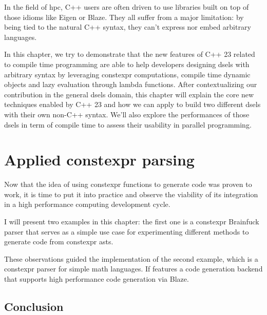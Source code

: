 \documentclass[english,12pt,a4paper]{book}
\providecommand{\cpp}{\textsc{C++}\xspace}
\begin{document}
In the field of \acrlong{hpc}, \cpp users are often driven to use
libraries built on top of those idioms like Eigen\cite{eigen} or
Blaze\cite{blazelib,iglberger2012_2}. They all suffer from a major limitation:
by being tied to the natural \cpp syntax, they can't express nor embed arbitrary
languages.

In this chapter, we try to demonstrate that the new features of \cpp23 related
to compile time programming are able to help developers designing \glspl{dsel}
with arbitrary syntax by leveraging \gls{constexpr} computations, compile time
dynamic objects and lazy evaluation through lambda functions.
After contextualizing our contribution in the general \glspl{dsel} domain,
this chapter will explain the core new techniques enabled by \cpp23
and how we can apply to build two different \glspl{dsel} with their own
non-\cpp syntax. We'll also explore the performances of those \glspl{dsel}
in term of compile time to assess their usability in parallel programming.




\chapter{
  Applied constexpr parsing
}

Now that the idea of using \gls{constexpr} functions to generate code
was proven to work, it is time to put it into practice and observe
the viability of its integration in a high performance computing
development cycle.

I will present two examples in this chapter:
the first one is a \gls{constexpr} Brainfuck parser that serves as a simple
use case for experimenting different methods to generate code from
\gls{constexpr} \glspl{ast}.

These observations guided the implementation of the second example, which is a
\gls{constexpr} parser for simple math languages. If features a code generation
backend that supports high performance code generation via Blaze.




\section{Conclusion}
\end{document}
